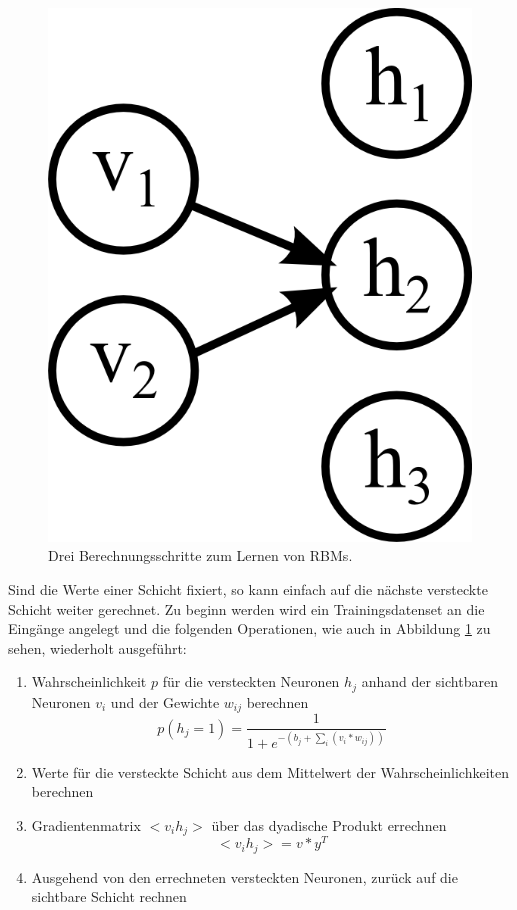 \begin{figure}
{\begin{minipage}{0.33\textwidth}
	\includegraphics[scale=1]{images/rbm-step3.png}\end{minipage}}
\caption{Drei Berechnungsschritte zum Lernen von RBMs.}
\label{fig:rbm-steps}
\end{figure}

Sind die Werte einer Schicht fixiert, so kann einfach auf die nächste versteckte Schicht weiter gerechnet. Zu beginn werden wird ein Trainingsdatenset an die Eingänge angelegt und die folgenden Operationen, wie auch in Abbildung \ref{fig:rbm-steps} zu sehen, wiederholt ausgeführt:

\begin{enumerate}
\item Wahrscheinlichkeit $p$ für die versteckten Neuronen $h_j$ anhand der sichtbaren Neuronen $v_i$ und der Gewichte $w_{ij}$ berechnen $$p(h_j=1) = \frac{1}{1+e^{-(b_j+\sum_{i}(v_i*w_{ij}))}}$$
\item Werte für die versteckte Schicht aus dem Mittelwert der Wahrscheinlichkeiten berechnen
\item Gradientenmatrix $<v_ih_j>$ über das dyadische Produkt errechnen $$<v_ih_j> = v*y^T$$
\item Ausgehend von den errechneten versteckten Neuronen, zurück auf die sichtbare Schicht rechnen
\end{enumerate}

